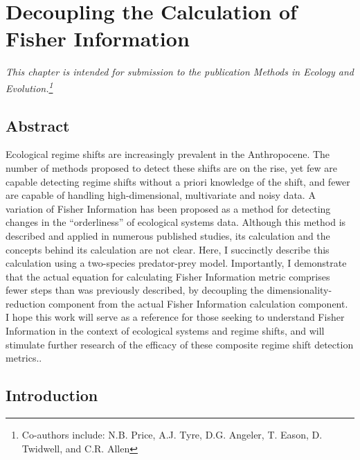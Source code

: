 \documentclass[12pt,twoside,openany]{reedthesis}
\begin{document}
\hypertarget{fiGuide}{%
\chapter{Decoupling the Calculation of Fisher Information}\label{fiGuide}}

\emph{This chapter is intended for submission to the publication \emph{Methods in Ecology and Evolution}.\footnote{Co-authors include: N.B. Price, A.J. Tyre, D.G. Angeler, T. Eason, D. Twidwell, and C.R. Allen}}

\hypertarget{abstract-1}{%
\section{Abstract}\label{abstract-1}}

Ecological regime shifts are increasingly prevalent in the Anthropocene. The number of methods proposed to detect these shifts are on the rise, yet few are capable detecting regime shifts without a priori knowledge of the shift, and fewer are capable of handling high-dimensional, multivariate and noisy data. A variation of Fisher Information has been proposed as a method for detecting changes in the ``orderliness'' of ecological systems data. Although this method is described and applied in numerous published studies, its calculation and the concepts behind its calculation are not clear. Here, I succinctly describe this calculation using a two-species predator-prey model. Importantly, I demonstrate that the actual equation for calculating Fisher Information metric comprises fewer steps than was previously described, by decoupling the dimensionality-reduction component from the actual Fisher Information calculation component. I hope this work will serve as a reference for those seeking to understand Fisher Information in the context of ecological systems and regime shifts, and will stimulate further research of the efficacy of these composite regime shift detection metrics..

\hypertarget{introduction-1}{%
\section{Introduction}\label{introduction-1}}
\end{document}
